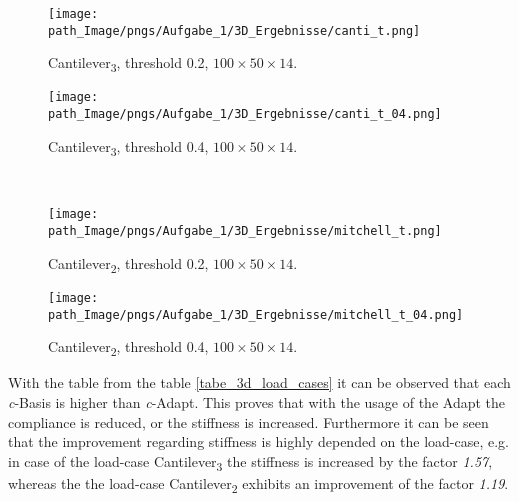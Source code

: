 \begin{figure}[!h]
\begin{minipage}{0.45\textwidth}
\centering
  \texttt{[image: path\_Image/pngs/Aufgabe\_1/3D\_Ergebnisse/canti\_t.png]}
	\caption{Cantilever\textsubscript{3}, threshold 0.2, $100\times 50 \times 14$.} 
	\label{fig_load_canti_02_t}
\end{minipage}
\hfill
\begin{minipage}{0.45\textwidth}
\centering
  \texttt{[image: path\_Image/pngs/Aufgabe\_1/3D\_Ergebnisse/canti\_t\_04.png]}
	\caption{Cantilever\textsubscript{3}, threshold 0.4, $100\times 50 \times 14$.} 
	\label{fig_load_canti_04_t}
\end{minipage}\\

\vspace{0.75cm}
\begin{minipage}{0.45\textwidth}
\centering
  \texttt{[image: path\_Image/pngs/Aufgabe\_1/3D\_Ergebnisse/mitchell\_t.png]}
	\caption{Cantilever\textsubscript{2}, threshold 0.2, $100\times 50 \times 14$.} 
	\label{fig_load_mitchell_02_t}
\end{minipage}
\hfill
\begin{minipage}{0.45\textwidth}
\centering
  \texttt{[image: path\_Image/pngs/Aufgabe\_1/3D\_Ergebnisse/mitchell\_t\_04.png]}
	\caption{Cantilever\textsubscript{2}, threshold 0.4, $100\times 50 \times 14$.}
\label{fig_load_mitchell_04_t}
\end{minipage}
\end{figure}
With the table from the table \ref{tabe_3d_load_cases} it
 can be observed that each \emph{c}-Basis is higher than 
 \emph{c}-Adapt. This proves that with the usage of the
Adapt the compliance is reduced, or the stiffness
is increased. Furthermore it can be seen that the
improvement regarding stiffness is highly depended on the
load-case, e.g. in case of the load-case Cantilever\textsubscript{3} the
stiffness is increased by the factor \emph{1.57}, whereas the
the load-case Cantilever\textsubscript{2} exhibits an improvement
of the factor \emph{1.19}.\\

